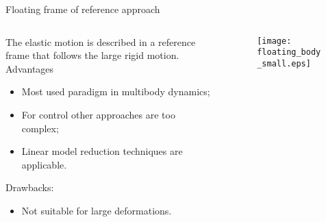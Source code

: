 \documentclass[aspectratio=169]{ISAE-Beamer}
\begin{document}
\begin{frame}{Floating frame of reference approach}
\begin{columns}
	\begin{column}{.5\textwidth}
		The elastic motion is described in a reference frame that follows the large rigid motion. \\
		
		Advantages 
		\begin{itemize}
			\item {Most used paradigm in multibody dynamics;}
			\item {For control other approaches are too complex;}
			\item {Linear model reduction techniques are applicable.} 
		\end{itemize}
		Drawbacks:
		\begin{itemize}
			\item {Not suitable for large deformations.}
		\end{itemize}	
	\end{column}
	\begin{column}{.5\textwidth}
		\begin{tcolorbox}
			\begin{figure}[t]
				\centering
				\texttt{[image: floating\_body\_small.eps]} 
			\end{figure}
		\end{tcolorbox}
	\end{column}
\end{columns}

\end{frame}
\end{document}
